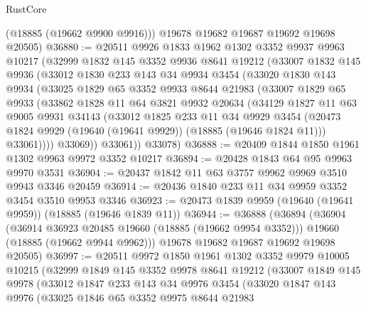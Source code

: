 \begin{lexlean}{RustCore}
\begin{coremodule}
        (@18885 (@19662 @9900 @9916)))
      @19678
      @19682
      @19687
      @19692
      @19698
      @20505)
@36880 := @20511
    @9926
    @1833
    @1962
    @1302
    @3352
    @9937
    @9963
    @10217
    (@32999
      @1832
      @145
      @3352
      @9936
      @8641
      @19212
      (@33007
        @1832
        @145
        @9936
        (@33012
          @1830
          @233
          @143
          @34
          @9934
          @3454
          (@33020
            @1830
            @143
            @9934
            (@33025
              @1829
              @65
              @3352
              @9933
              @8644
              @21983
              (@33007
                @1829
                @65
                @9933
                (@33862
                  @1828
                  @11
                  @64
                  @3821
                  @9932
                  @20634
                  (@34129
                    @1827
                    @11
                    @63
                    @9005
                    @9931
                    @34143
                    (@33012
                      @1825
                      @233
                      @11
                      @34
                      @9929
                      @3454
                      (@20473 @1824 @9929 (@19640 (@19641 @9929)) (@18885 (@19646 @1824 @11)))
                      @33061))))
              @33069))
          @33061))
      @33078)
@36888 := @20409 @1844 @1850 @1961 @1302 @9963 @9972 @3352 @10217
@36894 := @20428 @1843 @64 @95 @9963 @9970 @3531
@36904 := @20437 @1842 @11 @63 @3757 @9962 @9969 @3510 @9943 @3346 @20459
@36914 := @20436 @1840 @233 @11 @34 @9959 @3352 @3454 @3510 @9953 @3346
@36923 := @20473 @1839 @9959 (@19640 (@19641 @9959)) (@18885 (@19646 @1839 @11))
@36944 := @36888
    (@36894
      (@36904
        (@36914 @36923 @20485 @19660 (@18885 (@19662 @9954 @3352)))
        @19660
        (@18885 (@19662 @9944 @9962)))
      @19678
      @19682
      @19687
      @19692
      @19698
      @20505)
@36997 := @20511
    @9972
    @1850
    @1961
    @1302
    @3352
    @9979
    @10005
    @10215
    (@32999
      @1849
      @145
      @3352
      @9978
      @8641
      @19212
      (@33007
        @1849
        @145
        @9978
        (@33012
          @1847
          @233
          @143
          @34
          @9976
          @3454
          (@33020
            @1847
            @143
            @9976
            (@33025
              @1846
              @65
              @3352
              @9975
              @8644
              @21983

\end{coremodule}
\end{lexlean}
